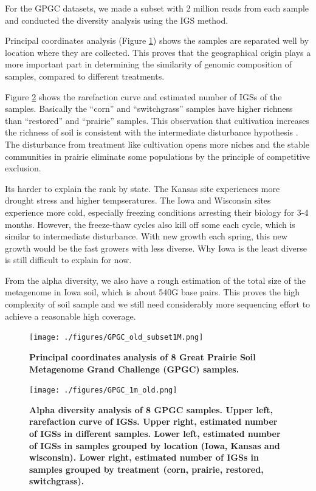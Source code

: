 For the GPGC datasets, we made a subset with 2 million reads from each sample 
and conducted the diversity analysis using the IGS method. 

Principal coordinates analysis (Figure \ref{fig:GPGC_beta}) shows the samples are 
separated well by location where they are collected.%
This proves that the geographical origin plays a more important part in 
determining the similarity of genomic composition of samples, compared to 
different treatments.

Figure \ref{fig:GPGC-alpha} shows the rarefaction curve and estimated number 
of IGSs of the samples. Basically the ``corn'' and ``switchgrass'' samples
have higher richness than ``restored'' and ``prairie'' samples. This observation 
that cultivation increases the richness of soil 
is consistent with the intermediate disturbance hypothesis \cite{wilkinson1999disturbing}. The disturbance 
from treatment like cultivation opens more niches and the stable 
communities in prairie eliminate some populations by the principle of 
competitive exclusion.

Its harder to explain the rank by state. 
The Kansas site experiences more drought stress and higher tempseratures. 
The Iowa and 
Wisconsin sites experience more cold, especially freezing conditions arresting 
their biology for 3-4 months. However, the freeze-thaw cycles also kill off 
some each cycle, which is similar to intermediate disturbance. With new 
growth each spring, this new growth would be the fast growers with 
less diverse. Why Iowa is the least diverse is still difficult to explain for now.

 From the alpha diversity, we also have a rough estimation of the total 
 size of the metagenome in Iowa soil, which is about 540G base pairs. This 
 proves the high complexity of soil sample and we still need considerably more sequencing 
 effort to achieve a reasonable high coverage.
 

\begin{figure}[!ht]
 \centerline{\texttt{[image: ./figures/GPGC\_old\_subset1M.png]}}
\caption{\bf Principal coordinates analysis of 8 Great Prairie Soil Metagenome
Grand Challenge (GPGC) samples.}
\label{fig:GPGC_beta}
\end{figure}



\begin{figure}[!ht]
 \centerline{\texttt{[image: ./figures/GPGC\_1m\_old.png]}}
\caption{\bf Alpha diversity analysis of 8 GPGC samples. Upper left,
rarefaction curve of IGSs. Upper right, estimated number of IGSs in different
samples. Lower left, estimated number of IGSs in samples grouped by
location (Iowa, Kansas and wisconsin). Lower right, estimated number of IGSs in
samples grouped by treatment (corn, prairie, restored, switchgrass).}
\label{fig:GPGC-alpha}
\end{figure}



